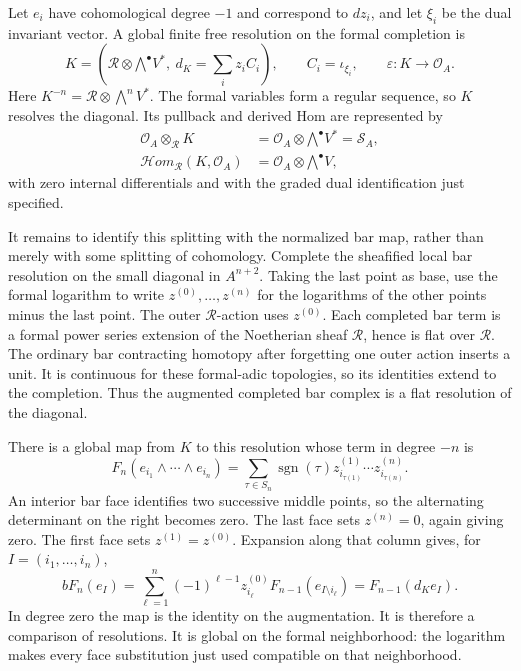 \documentclass[11pt]{article}
\numberwithin{equation}{section}
\begin{document}
Let \(e_i\) have cohomological degree \(-1\) and correspond to
\(dz_i\), and let \(\xi_i\) be the dual invariant vector.  A global
finite free resolution on the formal completion is
\begin{equation}
 K=\left(\mathcal R\otimes\mathord{\bigwedge}^{\bullet}V^*,
         \ d_K=\sum_i z_i C_i\right),\qquad
 C_i=\iota_{\xi_i},\qquad
 \varepsilon:K\longrightarrow\mathcal O_A.
\label{p3sw:hh-eq:koszul}
\end{equation}
Here \(K^{-n}=\mathcal R\otimes\bigwedge^nV^*\).
The formal variables form a regular sequence, so \(K\) resolves the
diagonal.  Its pullback and derived Hom are represented by
\begin{equation}
\begin{split}
 \mathcal O_A\otimes_{\mathcal R}K
   &=\mathcal O_A\otimes\mathord{\bigwedge}^{\bullet}V^*
       =\mathcal S_A,\\
 \mathcal{H}om_{\mathcal R}(K,\mathcal O_A)
   &=\mathcal O_A\otimes\mathord{\bigwedge}^{\bullet}V,
\end{split}
\label{p3sw:hh-eq:finite-diagonal-complexes}
\end{equation}
with zero internal differentials and with the graded dual
identification just specified.

It remains to identify this splitting with the normalized bar map,
rather than merely with some splitting of cohomology.  Complete the
sheafified local bar resolution on the small diagonal in
\(A^{n+2}\).  Taking the last point as base, use the formal logarithm
to write \(z^{(0)},\ldots,z^{(n)}\) for the logarithms of the other
points minus the last point.  The outer \(\mathcal R\)-action uses
\(z^{(0)}\).  Each completed bar term is a formal power series
extension of the Noetherian sheaf \(\mathcal R\), hence is flat over
\(\mathcal R\).  The ordinary bar contracting homotopy after
forgetting one outer action inserts a unit.  It is continuous for
these formal-adic topologies, so its identities extend to the
completion.  Thus the augmented completed bar complex is a flat
resolution of the diagonal.

There is a global map from \(K\) to this resolution whose term in
degree \(-n\) is
\begin{equation}
 F_n(e_{i_1}\wedge\cdots\wedge e_{i_n})
   =\sum_{\tau\in S_n}\operatorname{sgn}(\tau)
       z^{(1)}_{i_{\tau(1)}}\cdots z^{(n)}_{i_{\tau(n)}}.
\label{p3sw:hh-eq:koszul-bar}
\end{equation}
An interior bar face identifies two successive middle points, so the
alternating determinant on the right becomes zero.  The last face
sets \(z^{(n)}=0\), again giving zero.  The first face sets
\(z^{(1)}=z^{(0)}\).  Expansion along that column gives, for
\(I=(i_1,\ldots,i_n)\),
\[
 bF_n(e_I)
   =\sum_{\ell=1}^n(-1)^{\ell-1}z^{(0)}_{i_\ell}
          F_{n-1}(e_{I\setminus i_\ell})
   =F_{n-1}(d_K e_I).
\]
In degree zero the map is the identity on the augmentation.  It is
therefore a comparison of resolutions.  It is global on the formal
neighborhood: the logarithm makes every face substitution just used
compatible on that neighborhood.
\end{document}

